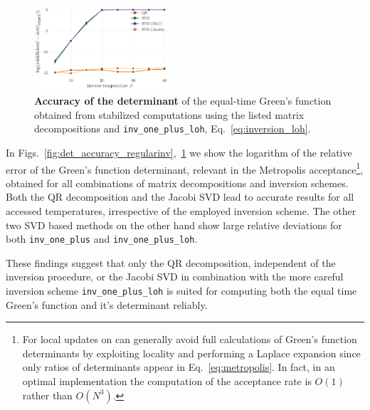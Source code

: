 \documentclass[%
 reprint,
superscriptaddress,
citeautoscript,
showpacs,
 amsmath,amssymb,
 aps,
 prb,
longbibliography,
]{revtex4-1}
\begin{document}
\begin{figure}
	\includegraphics[width=0.45\textwidth]{figures/accuracy_det_svd_loh.pdf}
	\caption{\textbf{Accuracy of the determinant} of the equal-time Green's function obtained from stabilized computations using the listed matrix decompositions and \texttt{inv\_one\_plus\_loh}, Eq.~\ref{eq:inversion_loh}. \label{fig:det_accuracy_loh}}
\end{figure}

In Figs.~\ref{fig:det_accuracy_regularinv},~\ref{fig:det_accuracy_loh} we show the logarithm of the relative error of the Green's function determinant, relevant in the Metropolis acceptance\footnote{For local updates on can generally avoid full calculations of Green's function determinants by exploiting locality and performing a Laplace expansion since only ratios of determinants appear in Eq.~\ref{eq:metropolis}. In fact, in an optimal implementation the computation of the acceptance rate is $O(1)$ rather than $O(N^3)$.}, obtained for all combinations of matrix decompositions and inversion schemes. Both the QR decomposition and the Jacobi SVD lead to accurate results for all accessed temperatures, irrespective of the employed inversion scheme. The other two SVD based methods on the other hand show large relative deviations for both \texttt{inv\_one\_plus} and \texttt{inv\_one\_plus\_loh}.

These findings suggest that only the QR decomposition, independent of the inversion procedure, or the Jacobi SVD in combination with the more careful inversion scheme \texttt{inv\_one\_plus\_loh} is suited for computing both the equal time Green's function and it's determinant reliably.
\end{document}
